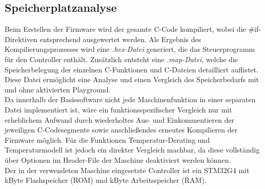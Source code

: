 \subsection{Speicherplatzanalyse}
Beim Erstellen der Firmware wird der gesamte C-Code kompiliert, wobei die \#if-Direktiven entsprechend ausgewertet werden. Als Ergebnis des Kompilierungsprozesses wird eine \textit{.hex-Datei} generiert, die das Steuerprogramm für den Controller enthält. Zusätzlich entsteht eine \textit{.map-Datei}, welche die Speicherbelegung der einzelnen C-Funktionen und C-Dateien detailliert auflistet. Diese Datei ermöglicht eine Analyse und einen Vergleich des Speicherbedarfs mit und ohne aktivierten Playground. \\
Da innerhalb der Basissoftware nicht jede Maschinenfunktion in einer separaten Datei implementiert ist, wäre ein funktionsspezifischer Vergleich nur mit erheblichem Aufwand durch wiederholtes Aus- und Einkommentieren der jeweiligen C-Codesegmente sowie anschließendes erneutes Kompilieren der Firmware möglich. Für die Funktionen Temperatur-Derating und Temperaturmodell ist jedoch ein direkter Vergleich machbar, da diese vollständig über Optionen im Header-File der Maschine deaktiviert werden können. \\
Der in der verwendeten Maschine eingesetzte Controller ist ein STM32G4 mit \unit[256]{kByte} Flashspeicher (ROM) und \unit[112]{kByte} Arbeitsspeicher (RAM).

